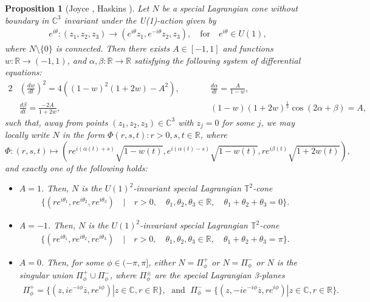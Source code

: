 \documentclass[11pt]{article}
\newtheorem{proposition}{Proposition}
\begin{document}
\begin{proposition} [Joyce \cite{MR2122282}, Haskins \cite{MR2075484}]\label{Joyce-Haskins} 
Let $N$ be a special Lagrangian cone without boundary in $\mathbb{C}^3$ invariant under the U(1)-action given by
    \begin{align*}
        e^{i \theta} : (z_1, z_2, z_3) \to (e^{i \theta} z_1, e^{-i \theta} z_2, z_3), \quad \text{for} \quad e^{i \theta} \in U(1),
    \end{align*} 
where $N \setminus \{0\}$ is connected. Then there exists $A \in [-1, 1]$ and functions $w : \mathbb{R} \rightarrow (-1,1)$, and $\alpha, \beta : \mathbb{R} \rightarrow \mathbb{R}$ satisfying the following system of differential equations:
\begin{alignat*}{2}
&(\frac{dw}{dt})^2 = 4((1-w)^2(1+2w)-A^2),  \quad \quad &&\frac{d\alpha}{dt} = \frac{A}{1-w}, \\
&\frac{d\beta}{dt} = \frac{-2A}{1+2w},  &&(1-w)(1+2w)^{\frac{1}{2}}\cos(2\alpha+\beta) = A,
\end{alignat*}
such that, away from points $(z_1, z_2, z_3) \in \mathbb{C}^3$ with $z_j = 0$ for some $j$, we may locally write $N$ in the form $\Phi(r, s, t) : r > 0, s, t \in \mathbb{R}$, where
\[
\Phi : (r, s, t) \mapsto (re^{i(\alpha(t)+s)} \sqrt{1 - w(t)}, e^{i(\alpha(t)-s)}\sqrt{1 - w(t)},  re^{i\beta(t)} \sqrt{1 + 2w(t)}),
\]
and exactly one of the following holds:
\begin{itemize}
  \item $A = 1$. Then, $N$ is the $U(1)^2$-invariant special Lagrangian $\mathbb{T}^2$-cone 
  \begin{align*}
      \{ (r e^{i\theta_1}, r e^{i\theta_2}, r e^{i\theta_3}) \quad | \quad r > 0, \quad \theta_1, \theta_2, \theta_3 \in \mathbb{R}, \quad \theta_1 + \theta_2 + \theta_3 = 0
      \}.
  \end{align*}

    \item $A = -1$. Then, $N$ is the $U(1)^2$-invariant special Lagrangian $\mathbb{T}^2$-cone 
    \begin{align*}
      \{ (r e^{i\theta_1}, r e^{i\theta_2}, r e^{i\theta_3}) \quad | \quad r > 0, \quad \theta_1, \theta_2, \theta_3 \in \mathbb{R}, \quad \theta_1 + \theta_2 + \theta_3 = \pi
      \}.
    \end{align*}
  
  
  \item $A = 0$. Then, for some $\phi \in (-\pi, \pi]$, either $N = \Pi_{\phi}^+$ or $N = \Pi_{\phi}^-$ or $N$ is the singular union $\Pi_{\phi}^+ \cup \Pi_{\phi}^-$, where $\Pi_{\phi}^{\pm}$ are the special Lagrangian 3-planes
  \begin{align*}
      \Pi_{\phi}^+ = \{(z,ie^{-i\phi}\overline{z},re^{i\phi}) | z \in \mathbb{C}, r \in \mathbb{R}\}, \; \text{ and } \; \Pi_{\phi}^- = \{(z,-ie^{-i\phi}\overline{z},re^{i\phi}) | z \in \mathbb{C}, r \in \mathbb{R}\}.
  \end{align*}
  

\end{itemize}
\end{proposition}
\end{document}
